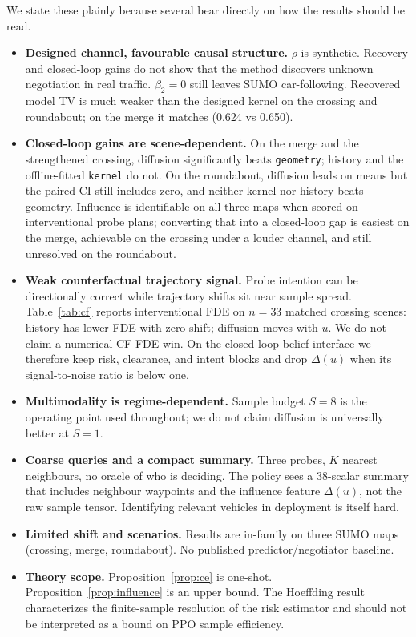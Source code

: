 \documentclass[conference]{IEEEtran}
\newcommand{\MergegtTV}{0.650}
\newcommand{\MergetvModelDec}{0.624}
\begin{document}
We state these plainly because several bear directly on how the results should
be read.

\begin{itemize}\itemsep1pt
\item \textbf{Designed channel, favourable causal structure.} $\rho$ is
synthetic. Recovery and closed-loop gains do not show that the method discovers
unknown negotiation in real traffic. $\beta_2=0$ still leaves SUMO
car-following. Recovered model TV is much weaker than the designed kernel on
the crossing and roundabout; on the merge it matches (\MergetvModelDec{} vs
\MergegtTV{}).

\item \textbf{Closed-loop gains are scene-dependent.}
On the merge and the strengthened crossing, diffusion significantly beats
\texttt{geometry}; history and the offline-fitted \texttt{kernel} do not.
On the roundabout, diffusion leads on means but the paired CI still includes
zero, and neither kernel nor history beats geometry. Influence is identifiable
on all three maps when scored on interventional probe plans; converting that
into a closed-loop gap is easiest on the merge, achievable on the crossing
under a louder channel, and still unresolved on the roundabout.

\item \textbf{Weak counterfactual trajectory signal.} Probe intention can be
directionally correct while trajectory shifts sit near sample spread.
Table~\ref{tab:cf} reports interventional FDE on $n{=}33$ matched crossing
scenes: history has lower FDE with zero shift; diffusion moves with $u$. We do
not claim a numerical CF FDE win. On the closed-loop belief interface we
therefore keep risk, clearance, and intent blocks and drop $\Delta(u)$ when
its signal-to-noise ratio is below one.

\item \textbf{Multimodality is regime-dependent.} Sample budget $S{=}8$ is the
operating point used throughout; we do not claim diffusion is universally
better at $S{=}1$.

\item \textbf{Coarse queries and a compact summary.} Three probes, $K$
nearest neighbours, no oracle of who is deciding. The policy sees a
$38$-scalar summary that includes neighbour waypoints and the influence
feature $\Delta(u)$, not the raw sample tensor. Identifying relevant
vehicles in deployment is itself hard.

\item \textbf{Limited shift and scenarios.} Results are in-family on three
SUMO maps (crossing, merge, roundabout). No published predictor/negotiator
baseline.

\item \textbf{Theory scope.} Proposition~\ref{prop:ce} is one-shot.
Proposition~\ref{prop:influence} is an upper bound. The Hoeffding result characterizes the finite-sample resolution of the risk estimator and should not be interpreted as a bound on PPO sample efficiency.
\end{itemize}
\end{document}
